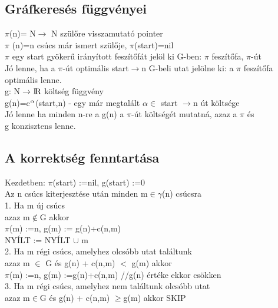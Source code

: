 \documentclass{article}
\begin{document}
	 \subsection{Gráfkeresés függvényei}
	 $\pi$(n)= N$\rightarrow$ N szülőre visszamutató pointer \\
	 \hspace*{1em} $\pi$ (n)=n csúcs már ismert szülője, $\pi$(start)=nil\\
	 \hspace*{2em} $\pi$ egy start gyökerű irányított feszítőfát jelöl ki G-ben: $\pi$ feszítőfa, $\pi$-út \\
	 \hspace*{2em} Jó lenne, ha a $\pi$-út optimális start$\rightarrow$n G-beli utat jelölne ki: a $\pi$ feszítőfa\\
	 \hspace*{2em} optimális lenne. \\
	 g: N$\rightarrow$${\rm I\!R}$ költség függvény\\
	 \hspace*{1em} g(n)=c$\textsuperscript{$\alpha$}$(start,n) - egy már megtalált $\alpha$$\in$ {start $\rightarrow$n} út költsége\\
	 \hspace*{1em} Jó lenne ha minden n-re a g(n) a $\pi$-út költségét mutatná, azaz a $\pi$ és\\
	 \hspace*{1em} g konzisztens lenne.
	 
	 \subsection{A korrektség fenntartása}
	 Kezdetben: $\pi$(start) :=nil, g(start) :=0\\
	 Az n csúcs kiterjesztése után minden m$\in$$\gamma$(n) csúcsra\\
	 \hspace*{1em} 1. Ha m új csúcs\\
	 \hspace*{2em} azaz m$\notin$G akkor\\
	 \hspace*{3em} $\pi$(m) :=n, g(m) := g(n)+c(n,m)\\
	 \hspace*{3em} NYÍLT := NYÍLT $\cup$ {m}\\
	 \hspace*{1em} 2. Ha m régi csúcs, amelyhez olcsóbb utat találtunk\\
	 \hspace*{2em} azaz m $\in$ G és g(n) + c(n,m) $<$ g(m) akkor\\
	 \hspace*{3em} $\pi$(m) :=n, g(m) :=g(n)+c(n,m) //g(n) értéke ekkor csökken\\
	 \hspace*{1em} 3. Ha m régi csúcs, amelyhez nem találtunk olcsóbb utat\\
	 \hspace*{2em} azaz m$\in$G és g(n) + c(n,m)  $\geq$g(m) akkor SKIP\\
	 
\end{document}

